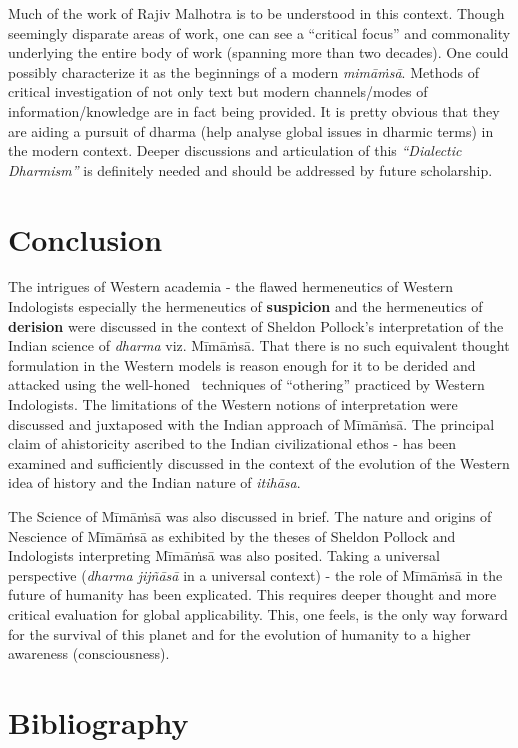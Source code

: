 Much of the work of Rajiv Malhotra is to be understood in this context. Though seemingly disparate areas of work, one can see a “critical focus” and commonality underlying the entire body of work (spanning more than two decades). One could possibly characterize it as the beginnings of a modern \textit{mimāṁsā}. Methods of critical investigation of not only text but modern channels/modes of information/knowledge are in fact being provided. It is pretty obvious that they are aiding a pursuit of dharma (help analyse global issues in dharmic terms) in the modern context. Deeper discussions and articulation of this \textit{“Dialectic Dharmism”} is definitely needed and should be addressed by future scholarship.


\section*{Conclusion}

The intrigues of Western academia - the flawed hermeneutics of Western Indologists especially the hermeneutics of \textbf{suspicion} and the hermeneutics of \textbf{derision} were discussed in the context of Sheldon Pollock’s interpretation of the Indian science of \textit{dharma} viz. Mīmāṁsā. That there is no such equivalent thought formulation in the Western models is reason enough for it to be derided and attacked using the well-honed  techniques of “othering” practiced by Western Indologists. The limitations of the Western notions of interpretation were discussed and juxtaposed with the Indian approach of Mīmāṁsā. The principal claim of ahistoricity ascribed to the Indian civilizational ethos - has been examined and sufficiently discussed in the context of the evolution of the Western idea of history and the Indian nature of \textit{itihāsa}.

The Science of Mīmāṁsā was also discussed in brief. The nature and origins of Nescience of Mīmāṁsā as exhibited by the theses of Sheldon Pollock and Indologists interpreting Mīmāṁsā was also posited. Taking a universal perspective (\textit{dharma jijñāsā} in a universal context) - the role of Mīmāṁsā in the future of humanity has been explicated. This requires deeper thought and more critical evaluation for global applicability. This, one feels, is the only way forward for the survival of this planet and for the evolution of humanity to a higher awareness (consciousness).


\section*{Bibliography}

